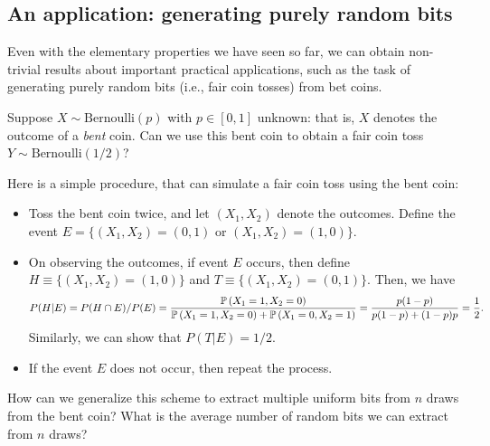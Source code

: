         \subsection{An application: generating purely random bits}
            Even with the elementary properties we have seen so far, we can obtain non-trivial results about important practical applications, such as the task of generating purely random bits (i.e., fair coin tosses) from bet coins. 
            \begin{question}
                \label{question:radom-bits} Suppose $X \sim \text{Bernoulli}(p)$ with $p \in [0,1]$ unknown:  that is, $X$ denotes the outcome of a \emph{bent} coin. Can we use this bent coin to obtain a fair coin toss $Y \sim \text{Bernoulli}(1/2)$? 
            \end{question}
            Here is a simple procedure, that can simulate a fair coin toss using the bent coin: 
            \begin{itemize}
                \item Toss the bent coin twice, and let $(X_1, X_2)$ denote the outcomes. 
                Define the event $E = \{ (X_1, X_2) = (0, 1) \text{ or } (X_1, X_2) = (1, 0)\}$. 

                \item On observing the outcomes, if event $E$ occurs, then define $H \equiv \{(X_1, X_2) = (1, 0)\}$ and $T \equiv \{(X_1, X_2) = (0, 1)\}$. Then, we have 
                \begin{align}
                    P(H|E) = P(H \cap E)/P(E) = \frac{\mathbb{P}\left( X_1 = 1, X_2 = 0\right)}{\mathbb{P}\left( X_1 = 1, X_2 = 0\right) + \mathbb{P}\left( X_1 = 0, X_2 = 1\right)}  = \frac{p(1-p)}{p(1-p) + (1-p)p} = \frac{1}{2}. 
                \end{align}
                Similarly, we can show that $P(T|E) = 1/2$. 
                \item If the event $E$ does not occur, then repeat the process. 
            \end{itemize}

            \begin{question}
                \label{question:random-bits-2} How can we generalize this scheme to extract multiple uniform bits from $n$ \iid draws from the bent coin? What is the average number of random bits we can extract from $n$ \iid draws? 
            \end{question}            

